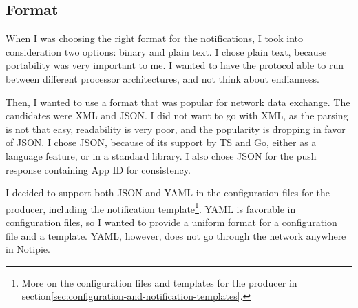 \subsection{Format}\label{sec:protocol-format}

When I was choosing the right format
for the notifications,
I took into consideration two options:
binary and plain text.
I chose plain text,
because portability was very important to me.
I wanted to have the protocol able to run
between different processor architectures,
and not think about endianness.

Then, I wanted to use a format
that was popular for network data exchange.
The candidates were \ac{XML} and \ac{JSON}.
I did not want to go with \ac{XML},
as the parsing is not that easy,
readability is very poor,
and the popularity is dropping
in favor of \ac{JSON}.
I chose \ac{JSON},
because of its support by \acf{TS} and Go,
either as a language feature,
or in a standard library.
I also chose \ac{JSON} for the push response
containing App \ac{ID}
for consistency.

I decided to support both \ac{JSON} and \ac{YAML}
in the configuration files for the producer,
including the notification template\footnote{
  More on the configuration files and templates
  for the producer
  in section\ref{sec:configuration-and-notification-templates}.
}.
\ac{YAML} is favorable in configuration files,
so I wanted to provide a uniform
format for a configuration file
and a template.
\ac{YAML}, however,
does not go through the network
anywhere in Notipie.
